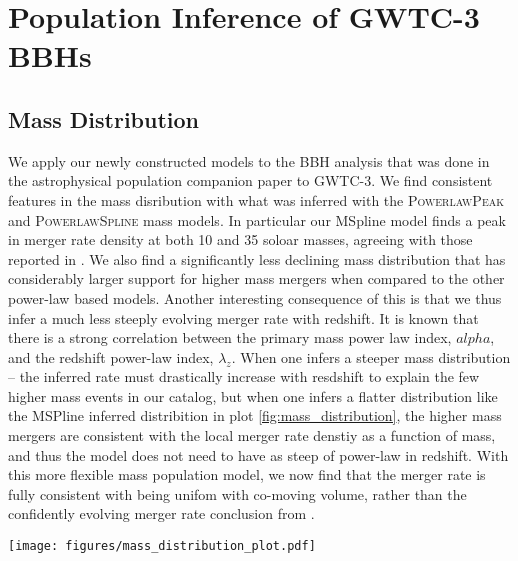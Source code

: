 \section{Population Inference of GWTC-3 BBHs} \label{sec:results}

\subsection{Mass Distribution} \label{sec:mass_dist}

We apply our newly constructed models to the BBH analysis that was done in the astrophysical population companion paper to GWTC-3. 
We find consistent features in the mass disribution with what was inferred with the \textsc{PowerlawPeak} and \textsc{PowerlawSpline} 
mass models. In particular our MSpline model finds a peak in merger rate density at both 10 and 35 soloar masses, agreeing with those reported
in . We also find a significantly less declining mass distribution that has considerably larger support for higher mass 
mergers when compared to the other power-law based models. Another interesting consequence of this is that we thus infer a much less steeply
evolving merger rate with redshift. It is known that there is a strong correlation between the primary mass power law index, $alpha$, and the 
redshift power-law index, $\lambda_z$. When one infers a steeper mass distribution -- the inferred rate must drastically increase 
with resdshift to explain the few higher mass events in our catalog, but when one infers a flatter distribution like the MSPline inferred
distribition in plot \ref{fig:mass_distribution}, the higher mass mergers are consistent with the local merger rate denstiy as a function of mass, 
and thus the model does not need to have as steep of power-law in redshift. With this more flexible mass population model, we now 
find that the merger rate is fully consistent with being unifom with co-moving volume, rather than the confidently evolving merger rate 
conclusion from . 

\begin{figure*}[ht!]
    \begin{centering}
        \texttt{[image: figures/mass\_distribution\_plot.pdf]}
        \caption{Plot showing the primary mass (left) and mass ratio (right) distributions inferred with the 
        \textsc{MSpline} model (black) with 40 knots for $m_1$, and 15 knots for $q$. We show the results for the \textsc{PowerlawPeak} (blue) and 
        \textsc{PowerlawSpline} (orange) models fromthe LVK's GWTC-3 population analyses. Solid lines show the median of the posterior while the shaded
        bands show the 90\% credible intervals.}
        \label{fig:mass_distribution}
    \end{centering}
\end{figure*}


